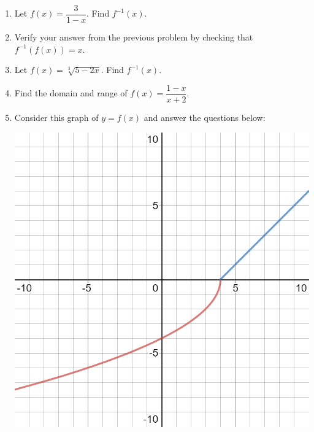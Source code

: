 \documentclass[12pt]{article}
\begin{document}
\begin{enumerate}
\pagebreak

\item Let $f(x) = \dfrac{3}{1-x}$. Find $f^{-1}(x)$.

\vfill

\item Verify your answer from the previous problem by checking that $f^{-1}(f(x)) = x$.
\vfill


\item  Let $f(x) = \sqrt[3]{5-2x}$. Find $f^{-1}(x)$.

\vfill

\pagebreak



\item Find the domain and range of $f(x) = \dfrac{1-x}{x+2}$.  
\vfill


\item Consider this graph of $y=f(x)$ and answer the questions below:

\begin{center}
\includegraphics[scale=.4]{inverse2.png}
\end{center}

\begin{enumerate}


\end{enumerate}
\end{enumerate}
\end{document}
